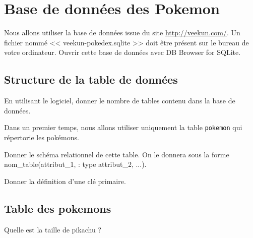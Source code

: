 
\section*{Base de données des Pokemon}
\label{sec:bdd}

Nous allons utiliser la base de données issue du site \url{http://veekun.com/}. Un fichier nommé << veekun-pokedex.sqlite >> doit être présent sur le bureau de votre ordinateur. Ouvrir cette base de données avec DB Browser for SQLite.


%

\subsection*{Structure de la table de données}

\question{}
En utilisant le logiciel, donner le nombre de tables contenu dans la base de données. 


Dans un premier temps, nous allons utiliser uniquement la table \texttt{pokemon} qui répertorie les pokémons.

\question{}
Donner le schéma relationnel de cette table. On le donnera sous la forme nom\_table(attribut\_1, : type attribut\_2, ...).

\question{}
Donner la définition d'une clé primaire.

\subsection*{Table des pokemons}



\question{}
Quelle est la taille de pikachu ?

